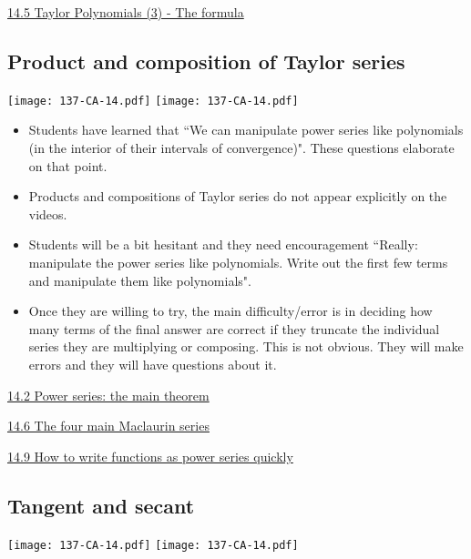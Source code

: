 \documentclass[11pt]{article}
\newcommand{\nl}{\hfill \vspace{-1.1\baselineskip}} %
\newcommand{\vii}{\hspace{8mm}  \href{https://www.youtube.com/watch?v=IEH7d9XiqqA&list=PLlwePzQY_wW9h32ZwS6CYsY4eR_b2pE9j&index=2}{14.2 Power series: the main theorem}}
\newcommand{\vv}{\hspace{8mm}  \href{https://www.youtube.com/watch?v=c-rI1zMj0wA&list=PLlwePzQY_wW9h32ZwS6CYsY4eR_b2pE9j&index=5}{14.5 Taylor Polynomials (3) - The formula}}
\newcommand{\vvi}{\hspace{8mm}  \href{https://www.youtube.com/watch?v=o-RSENE_Yus&list=PLlwePzQY_wW9h32ZwS6CYsY4eR_b2pE9j&index=6}{14.6 The four main Maclaurin series}}
\newcommand{\vix}{\hspace{8mm}  \href{https://www.youtube.com/watch?v=ksKu5p2qvB4&list=PLlwePzQY_wW9h32ZwS6CYsY4eR_b2pE9j&index=9}{14.9 How to write functions as power series quickly}}
\begin{document}
\begin{videos}
\vv
\end{videos}

\newpage
\subsection{Product and composition of Taylor series}

\begin{center}
{ \texttt{[image: 137-CA-14.pdf]}} \quad
{ \texttt{[image: 137-CA-14.pdf]}} 
\end{center}

\begin{comments}
\nl
	\begin{itemize}
		\item  Students have learned that ``We can manipulate power series like polynomials (in the interior of their intervals of convergence)".  These questions elaborate on that point.
		
		\item Products and compositions of Taylor series do not appear explicitly on the videos.
		
		\item Students will be a bit hesitant and they need encouragement  ``Really: manipulate the power series like polynomials.  Write out the first few terms and manipulate them like polynomials".
		
		\item Once they are willing to try, the main difficulty/error is in deciding how many terms of the final answer are correct if they truncate the individual series they are multiplying or composing.  This is not obvious.  They will make errors and they will have questions about it.
	\end{itemize}
\end{comments}

\begin{videos}
\vii

\vvi

\vix
\end{videos}

\newpage
\subsection{Tangent and secant}

\begin{center}
{ \texttt{[image: 137-CA-14.pdf]}}  \quad
{ \texttt{[image: 137-CA-14.pdf]}} 
\end{center}
\end{document}
